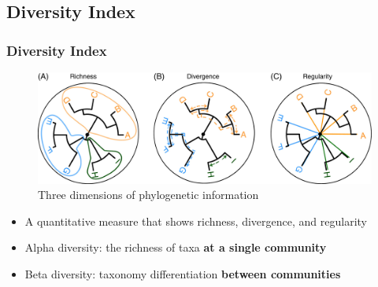 \documentclass{beamer}
\begin{document}
    \subsection{Diversity Index}
    \begin{frame}
        \frametitle{Diversity Index}

        \begin{figure}
            \includegraphics[width=0.6 \linewidth]{figures/phylogenic.jpg}
            \caption{Three dimensions of phylogenetic information \protect\cite{phylogenetic1}}
        \end{figure}

        \begin{itemize}
            \item A quantitative measure that shows richness, divergence, and regularity \cite{phylogenetic1}
            \item Alpha diversity: the richness of taxa \textbf{at a single community}
            \item Beta diversity: taxonomy differentiation \textbf{between communities}
        \end{itemize}
    \end{frame}
\end{document}
